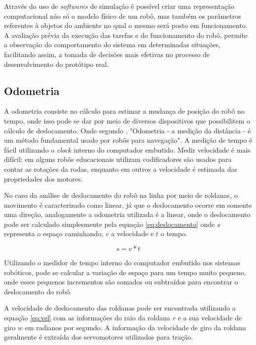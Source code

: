 Através do uso de \textit{softwares} de simulação é possível criar uma representação computacional não só o modelo físico de um robô, mas também os parâmetros referentes à objetos do ambiente no qual o mesmo será posto em funcionamento. A avaliação prévia da execução das tarefas e do funcionamento do robô, permite a observação do comportamento do sistema em determinadas situações, facilitando assim, a tomada de decisões mais efetivas no processo de desenvolvimento do protótipo real. 

\subsection{Odometria}\label{sec:odom}
A odometria consiste no cálculo para estimar a mudança de posição do robô no tempo, onde isso pode se dar por meio de diversos dispositivos que possibilitem o cálculo de deslocamento. Onde segundo \cite{ben2018robotic}, "Odometria - a medição da distância - é um método fundamental usado por robôs para navegação". A medição de tempo é fácil utilizando o \textit{clock} interno do computador embutido. Medir velocidade é mais difícil: em alguns robôs educacionais utilizam codificadores são usados para contar as rotações da rodas, enquanto em outros a velocidade é estimada das propriedades dos motores.

No caso da análise de deslocamento do robô na linha por meio de roldanas, o movimento é caracterizado como linear, já que o deslocamento ocorre em somente uma direção, analogamente a odometria utilizada é a linear, onde o deslocamento pode ser calculado simplesmente pela equação \ref{eq:deslocamento} onde $s$ representa o espaço caminhando, $v$ a velocidade e $t$ o tempo. 

\begin{equation}\label{eq:deslocamento}
s = v*t
\end{equation}

Utilizando o medidor de tempo interno do computador embutido nos sistemas robóticos, pode se calcular a variação de espaço para um tempo muito pequeno, onde esses pequenos incrementos são somados ou subtraídos para encontrar o deslocamento do robô.

A velocidade de deslocamento das roldanas pode ser encontrada utilizando a equação \ref{eq:vel} com as informações do raio da roldana $r$ e a sua velocidade de giro $w$ em radianos por segundo. A informação da velocidade de giro da roldana geralmente é extraída dos servomotores utilizados para tração.

